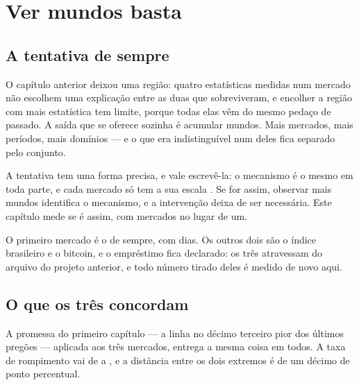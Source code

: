 %
%

\chapter{Ver mundos basta}
\label{cap:observar}

\section{A tentativa de sempre}

O capítulo anterior deixou uma região: quatro estatísticas medidas num mercado não escolhem uma
explicação entre as duas que sobreviveram, e encolher a região com mais estatística tem limite,
porque todas elas vêm do mesmo pedaço de passado. A saída que se oferece sozinha é acumular
mundos. Mais mercados, mais períodos, mais domínios --- e o que era indistinguível num deles fica
separado pelo conjunto.

A tentativa tem uma forma precisa, e vale escrevê-la: o mecanismo é o mesmo em toda parte, e cada
mercado só tem a sua escala \cite{peters2016causal}. Se for assim, observar mais mundos identifica o mecanismo, e a
intervenção deixa de ser necessária. Este capítulo mede se é assim, com \numObservarMercados{}
mercados no lugar de um.

O primeiro mercado é o de sempre, com \numObservarDiasMaior{} dias. Os outros dois são o índice
brasileiro e o bitcoin, e o empréstimo fica declarado: os três atravessam do arquivo do projeto
anterior, e todo número tirado deles é medido de novo aqui.

\section{O que os três concordam}

A promessa do primeiro capítulo --- a linha no décimo terceiro pior dos últimos
\numCorteJanela{} pregões --- aplicada aos três mercados, entrega a mesma coisa em todos. A taxa
de rompimento vai de \numObservarTaxaMenor{} a \numObservarTaxaMaior{}, e a distância entre os dois
extremos é de um décimo de ponto percentual.

